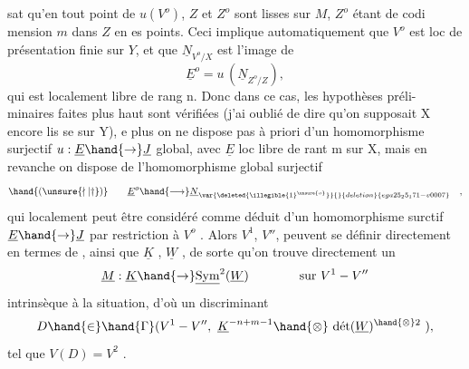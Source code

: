 
sat qu'en tout point de $u(V^{o})$, $Z$ et $Z^{o}$ sont lisses sur $M$, $Z^{o}$ étant de codi
mension $m$ dans $Z$ en es points. Ceci implique automatiquement que $V^{o}$ est
loc de présentation finie sur $Y$, et que $\underline{N}_{V^{o}/X}$ est l'image de
\[ \underline{E}^{o} = u\,(\underline{N}_{Z^{o}/Z}) , \]
qui est localement libre de rang n. Donc dans ce cas, les hypothèses préli-%
minaires faites plus haut sont vérifiées (j'ai oublié de dire qu'on supposait
X encore lis se sur Y), e plus on ne dispose pas à priori d'un homomorphisme
surjectif $u:\underline{E}\hand{\rightarrow}\underline{J}$ global, avec $\underline{E}$ loc libre de rant m sur X, mais en revanche
on dispose de l'homomorphisme global surjectif
\[ \hand{(\unsure{\nmid|\dagger})} \qquad \underline{E}^{o}\hand{\longrightarrow} \underline{N}_{\var{\deleted{\illegible{1}^{\unsure{o}}}}{}{deletion}{ega25_25_171-v0007}} \quad , \]
qui localement peut être considéré comme déduit d'un homomorphisme surctif
$\underline{E}\hand{\rightarrow}\underline{J}$ par restriction à $V^{o}$ . Alors $V^{1}$, $V''$, peuvent se définir directement
en termes de \hand{(\unsure{\nmid|\dagger})} , ainsi que $\underline{K}$ , $\underline{W}$ , de sorte qu'on trouve directement un
\[ \underline{M} : \underline{K}\hand{\rightarrow} \underline{\mathrm{Sym}}^{2}(\underline{W}) \qquad\qquad \text{sur } V^{1}-V'' \]
intrinsèque à la situation, d'où  un discriminant
\[ D \hand{\in} \hand{\Gamma}(V^{1}-V'',\ \underline{K}^{-n+m-1}\hand{\otimes}\ \text{dét}(\underline{W})^{\hand{\otimes}2}\ ), \]
tel que $V(D) = V^{2}$ .

